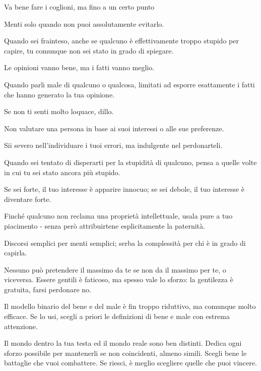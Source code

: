 Va bene fare i coglioni, ma fino a un certo punto

Menti solo quando non puoi assolutamente evitarlo.

Quando sei frainteso, anche se qualcuno è effettivamente troppo stupido per capire, tu comunque non sei stato in grado di spiegare.

Le opinioni vanno bene, ma i fatti vanno meglio.



Quando parli male di qualcuno o qualcosa, limitati ad esporre esattamente i fatti che hanno generato la tua opinione.

Se non ti senti molto loquace, dillo.

Non valutare una persona in base ai suoi interessi o alle sue preferenze.

Sii severo nell’individuare i tuoi errori, ma indulgente nel perdonarteli.

Quando sei tentato di disperarti per la stupidità di qualcuno, pensa a quelle volte in cui tu sei stato ancora più stupido.

Se sei forte, il tuo interesse è apparire innocuo; se sei debole, il tuo interesse è diventare forte.



Finché qualcuno non reclama una proprietà intellettuale, usala pure a tuo piacimento - senza però attribuirtene esplicitamente la paternità.

Discorsi semplici per menti semplici; serba la complessità per chi è in grado di capirla.

Nessuno può pretendere il massimo da te se non da il massimo per te, o viceversa.
Essere gentili è faticoso, ma spesso vale lo sforzo: la gentilezza è gratuita, farsi perdonare no.


Il modello binario del bene e del male è fin troppo riduttivo, ma comunque molto efficace. Se lo usi, scegli a priori le definizioni di bene e male con estrema attenzione.

Il mondo dentro la tua testa ed il mondo reale sono ben distinti. Dedica ogni sforzo possibile per mantenerli se non coincidenti, almeno simili.
Scegli bene le battaglie che vuoi combattere. Se riesci, è meglio scegliere quelle che puoi vincere.
​